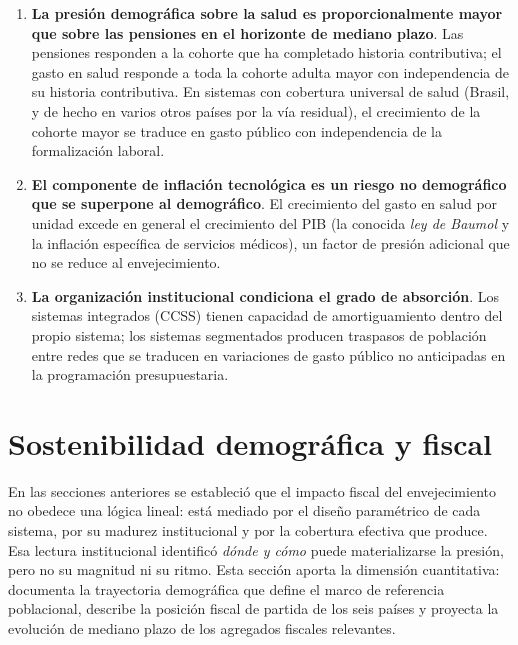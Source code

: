 \documentclass[12pt, letterpaper]{article}
\begin{document}
\begin{enumerate}
  \item \textbf{La presión demográfica sobre la salud es proporcionalmente mayor
        que sobre las pensiones en el horizonte de mediano plazo}. Las pensiones
        responden a la cohorte que ha completado historia contributiva; el gasto
        en salud responde a toda la cohorte adulta mayor con independencia de su
        historia contributiva. En sistemas con cobertura universal de salud
        (Brasil, y de hecho en varios otros países por la vía residual), el
        crecimiento de la cohorte mayor se traduce en gasto público con
        independencia de la formalización laboral.
  \item \textbf{El componente de inflación tecnológica es un riesgo no
        demográfico que se superpone al demográfico}. El crecimiento del gasto
        en salud por unidad excede en general el crecimiento del PIB (la conocida
        \textit{ley de Baumol} y la inflación específica de servicios médicos),
        un factor de presión adicional que no se reduce al envejecimiento.
  \item \textbf{La organización institucional condiciona el grado de
        absorción}. Los sistemas integrados (CCSS) tienen capacidad de
        amortiguamiento dentro del propio sistema; los sistemas segmentados producen
        traspasos de población entre redes que se traducen en variaciones
        de gasto público no anticipadas en la programación presupuestaria.
\end{enumerate}

\newpage

\section{Sostenibilidad demográfica y fiscal}
\label{sec:sostenibilidad}

En las secciones anteriores se estableció que el impacto fiscal del envejecimiento no obedece una lógica lineal:
está mediado por el diseño paramétrico de cada sistema, por su madurez institucional
y por la cobertura efectiva que produce. Esa lectura institucional identificó
\emph{dónde y cómo} puede materializarse la presión, pero no su magnitud ni su ritmo. Esta
sección aporta la dimensión cuantitativa: documenta la trayectoria demográfica que
define el marco de referencia poblacional, describe la posición fiscal de partida de los seis
países y proyecta la evolución de mediano plazo de los agregados fiscales relevantes.
\end{document}
